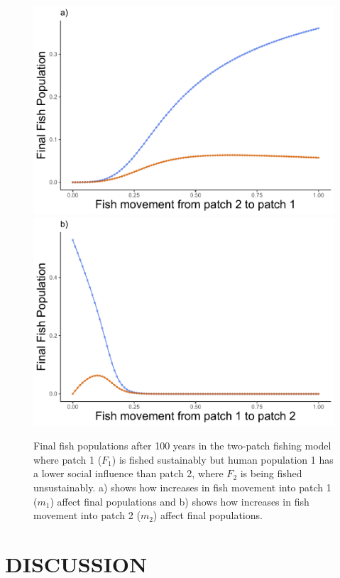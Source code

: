 \documentclass[
  12pt,
]{article}
\begin{document}
\begin{figure}
\includegraphics[width=0.5\linewidth]{Wulfing_CH2_Draft4_files/figure-latex/mExploreGraph-1} \includegraphics[width=0.5\linewidth]{Wulfing_CH2_Draft4_files/figure-latex/mExploreGraph-2} \caption{Final fish populations after 100 years in the two-patch fishing model where patch 1 (\(F_1\)) is fished sustainably but human population 1 has a lower social influence than patch 2, where \(F_2\) is being fished unsustainably. a) shows how increases in fish movement into patch 1 (\(m_1\)) affect final populations and b) shows how increases in fish movement into patch 2 (\(m_2\)) affect final populations. \label{mExploreGraph}}\label{fig:mExploreGraph}
\end{figure}



\section{DISCUSSION}\label{discussion}
\end{document}
